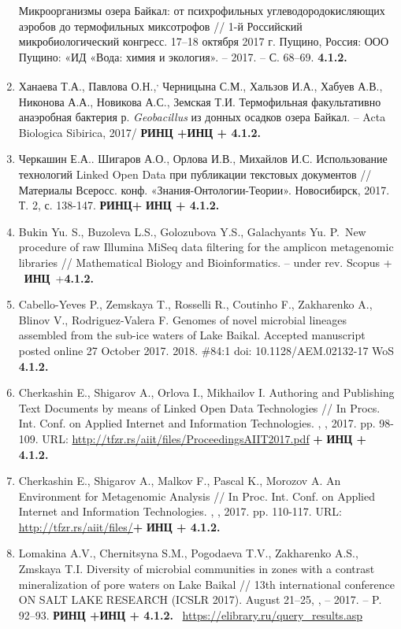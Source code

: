 \documentclass[a4paper,12pt,openany,final]{extreport}
\begin{document}
\begin{enumerate}
  Микроорганизмы озера Байкал: от психрофильных углеводородокисляющих
  аэробов до термофильных миксотрофов // 1-й Российский
  микробиологический конгресс. 17--18 октября 2017 г. Пущино, Россия:
  ООО Пущино: «ИД «Вода: химия и экология». -- 2017. -- С. 68--69.
  \textbf{4.1.2.}
\item
  Ханаева Т.А., Павлова О.Н.,\textsuperscript{,} Черницына С.М., Хальзов
  И.А., Хабуев А.В., Никонова А.А., Новикова А.С., Земская Т.И.
  Термофильная факультативно анаэробная бактерия р. \emph{Geobacillus}
  из донных осадков озера Байкал. -- Acta Biologica Sibirica, 2017/
  \textbf{РИНЦ +ИНЦ + 4.1.2.} ~
\item
  Черкашин Е.А.. Шигаров А.О., Орлова И.В., Михайлов И.С. Использование
  технологий Linked Open Data при публикации текстовых документов //
  Материалы Всеросс. конф. «Знания-Онтологии-Теории». Новосибирск, 2017.
  Т. 2, с. 138-147. \textbf{РИНЦ+} \textbf{ИНЦ + 4.1.2.}
\item
  Bukin Yu. S., Buzoleva L.S., Golozubova Y.S., Galachyants Yu. P.~New
  procedure of raw Illumina MiSeq data filtering for the amplicon
  metagenomic libraries // Mathematical Biology and Bioinformatics. --
  under rev. Scopus + ~\textbf{ИНЦ}~+\textbf{4.1.2.}
\item
  Cabello-Yeves P., Zemskaya T., Rosselli R., Coutinho F., Zakharenko
  A., Blinov V., Rodriguez-Valera F. Genomes of novel microbial lineages
  assembled from the sub-ice waters of Lake Baikal. Accepted manuscript
  posted online 27 October 2017. 2018. \#84:1 doi: 10.1128/AEM.02132-17
  WoS \textbf{4.1.2.}
\item
  Cherkashin E., Shigarov A., Orlova I., Mikhailov I. Authoring and
  Publishing Text Documents by means of Linked Open Data Technologies //
  In Procs. Int. Conf. on Applied Internet and Information Technologies.
  , , 2017. pp. 98-109. URL:
  \url{http://tfzr.rs/aiit/files/ProceedingsAIIT2017.pdf} \textbf{+}
  \textbf{ИНЦ + 4.1.2.}
\item
  Cherkashin E., Shigarov A., Malkov F., Pascal K., Morozov A. An
  Environment for Metagenomic Analysis // In Proc. Int. Conf. on Applied
  Internet and Information Technologies. , , 2017. pp. 110-117. URL:
  \href{http://tfzr.rs/aiit/files/ProceedingsAIIT2017.pdf}{{http://tfzr.rs/aiit/files/}}\textbf{+}
  \textbf{ИНЦ + 4.1.2.}
\item
  Lomakina A.V., Chernitsyna S.M., Pogodaeva T.V., Zakharenko A.S.,
  Zmskaya T.I. Diversity of microbial communities in zones with a
  contrast mineralization of pore waters on Lake Baikal // 13th
  international conference ON SALT LAKE RESEARCH (ICSLR 2017). August
  21--25, , -- 2017. -- P. 92--93. \textbf{РИНЦ +ИНЦ + 4.1.2.}
  ~\href{https://elibrary.ru/query_results.asp}{{https://elibrary.ru/query\_results.asp}}
\end{enumerate}
\end{document}
